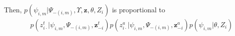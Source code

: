 \documentclass[12pt]{article}
\begin{document}
Then, $p(\psi_{i,m} \vert \Psi_{-(i,m)}, \Upsilon, \mathbf{z}, \theta, Z_i)$ is proportional to
\begin{align}
 & p(z^t_{i\cdot} \vert \psi_{i,m}, \Psi_{-(i,m)}, \mathbf{z}^t_{-i}) p(z^a_{i\cdot} \vert \psi_{i,m}, \Psi_{-(i,m)}, \mathbf{z}^a_{-i}) p(\psi_{i,m} \vert \theta, Z_i)
\end{align}





\end{document}
